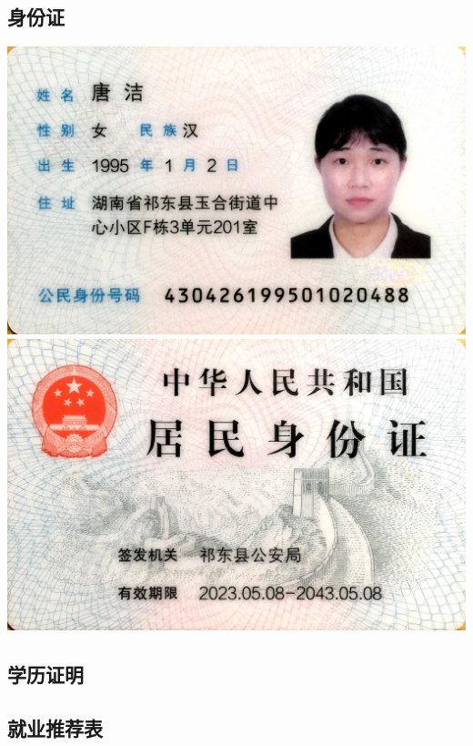 \documentclass[UFT8]{ctexart}%
\begin{document}
\subsection{身份证}
\begin{center}
  \includegraphics[scale=0.12]{figs/身份证1.png }
  \includegraphics[scale=0.12]{figs/身份证2.png }
\end{center}

\subsection{学历证明}







\subsection{就业推荐表}

%  
%  
\end{document}
